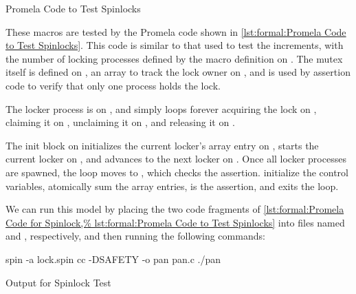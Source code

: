 \begin{listing}

\caption{Promela Code to Test Spinlocks}
\label{lst:formal:Promela Code to Test Spinlocks}
\end{listing}

\begin{fcvref}
These macros are tested by the Promela code shown in
\cref{lst:formal:Promela Code to Test Spinlocks}.
This code is similar to that used to test the increments,
with the number of locking processes defined by the 
macro definition on .
The mutex itself is defined on ,
an array to track the lock owner
on , and  is used by assertion
code to verify that only one process holds the lock.
\end{fcvref}

\begin{fcvref}
The locker process is on , and simply loops forever
acquiring the lock on , claiming it on ,
unclaiming it on , and releasing it on .
\end{fcvref}

\begin{fcvref}
The init block on  initializes the current locker's
 array entry on , starts the current locker on
, and advances to the next locker on .
Once all locker processes are spawned, the  loop
moves to , which checks the assertion.
 initialize the control variables,
 atomically sum the  array entries,
 is the assertion, and  exits the loop.
\end{fcvref}

We can run this model by placing the two code fragments of
\cref{lst:formal:Promela Code for Spinlock,%
lst:formal:Promela Code to Test Spinlocks} into
files named  and , respectively, and then running
the following commands:

\begin{VerbatimU}
spin -a lock.spin
cc -DSAFETY -o pan pan.c
./pan
\end{VerbatimU}

\begin{listing}
\vspace*{-9pt}
\caption{Output for Spinlock Test}
\label{lst:formal:Output for Spinlock Test}
\end{listing}

